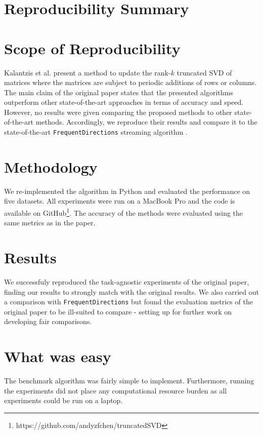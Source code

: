 \section*{Reproducibility Summary}
\label{sec:summary}

\section*{Scope of Reproducibility}

Kalantzis et al. \cite{Kalantzis2021} present a method to update the rank-$k$ truncated SVD of matrices where the matrices are subject to periodic additions of rows or columns.
The main claim of the original paper states that the presented algorithms outperform other state-of-the-art approaches in terms of accuracy and speed.
However, no results were given comparing the proposed methods to other state-of-the-art methods.
Accordingly, we reproduce their results and compare it to the state-of-the-art \verb|FrequentDirections| streaming algorithm \cite{Ghashami2016}.

\section*{Methodology}

We re-implemented the algorithm in Python and evaluated the performance on five datasets.
All experiments were run on a MacBook Pro and the code is available on GitHub\footnote{https://github.com/andyzfchen/truncatedSVD}.
The accuracy of the methods were evaluated using the same metrics as in the paper.

\section*{Results}

We successfuly reproduced the task-agnostic experiments of the original paper, finding our results to strongly match with the original results.
We also carried out a comparison with \verb|FrequentDirections| but found the evaluation metrics of the original paper to be ill-suited to compare - setting up for further work on developing fair comparisons. 

\section*{What was easy}

The benchmark algorithm was fairly simple to implement.
Furthermore, running the experiments did not place any computational resource burden as all experiments could be run on a laptop.

